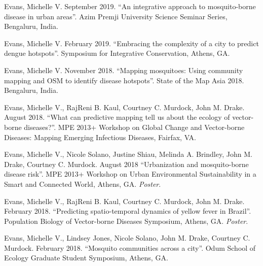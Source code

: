 
\begin{cvitems}
	\bigskip
	\item Evans, Michelle V. September 2019. ``An integrative approach to mosquito-borne disease in urban areas''. Azim Premji University Science Seminar Series, Bengaluru, India.

	\item Evans, Michelle V. February 2019. ``Embracing the complexity of a city to predict dengue hotspots''. Symposium for Integrative Conservation, Athens, GA.

	\item Evans, Michelle V. November 2018. ``Mapping mosquitoes: Using community mapping and OSM to identify disease hotspots''. State of the Map Asia 2018. Bengaluru, India.

	\item Evans, Michelle V., RajReni B. Kaul, Courtney C. Murdock, John M. Drake. August 2018. ``What can predictive mapping tell us about the ecology of vector-borne diseases?''. MPE 2013+ Workshop on Global Change and Vector-borne Diseases: Mapping Emerging Infectious Diseases, Fairfax, VA.

	\item Evans, Michelle V., Nicole Solano, Justine Shiau, Melinda A. Brindley, John M. Drake, Courtney C. Murdock. August 2018 ``Urbanization and mosquito-borne disease risk''. MPE 2013+ Workshop on Urban Environmental Sustainability in a Smart and Connected World, Athens, GA. \textit{Poster}.

	\item Evans, Michelle V., RajReni B. Kaul, Courtney C. Murdock, John M. Drake. February 2018. ``Predicting spatio-temporal dynamics of yellow fever in Brazil''. Population Biology of Vector-borne Diseases Symposium, Athens, GA. \textit{Poster}.

	\item Evans, Michelle V., Lindsey Jones, Nicole Solano, John M. Drake, Courtney C. Murdock. February 2018. ``Mosquito communities across a city''. Odum School of Ecology Graduate Student Symposium, Athens, GA.


\end{cvitems}
